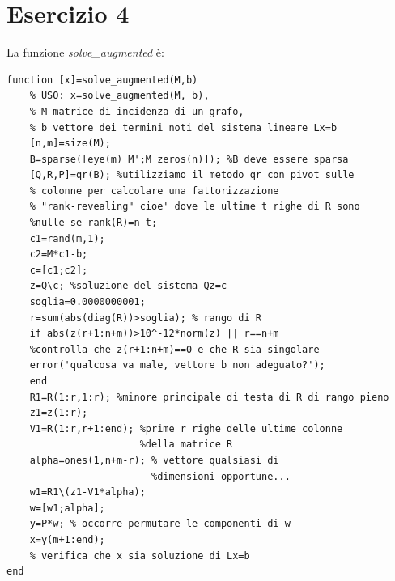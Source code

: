 \documentclass[11pt,a4paper,twoside,openright,titlepage,
                           headinclude,footinclude,BCOR5mm,
                           numbers=noenddot,cleardoublepage=empty,
                           tablecaptionabove]{scrbook}
\begin{document}
\section{Esercizio 4}
La funzione \emph{solve\_augmented} è:
\begin{lstlisting}[frame=trBL]
function [x]=solve_augmented(M,b)
    % USO: x=solve_augmented(M, b),
    % M matrice di incidenza di un grafo,
    % b vettore dei termini noti del sistema lineare Lx=b
    [n,m]=size(M);
    B=sparse([eye(m) M';M zeros(n)]); %B deve essere sparsa
    [Q,R,P]=qr(B); %utilizziamo il metodo qr con pivot sulle
    % colonne per calcolare una fattorizzazione
    % "rank-revealing" cioe' dove le ultime t righe di R sono 
    %nulle se rank(R)=n-t;
    c1=rand(m,1);
    c2=M*c1-b;
    c=[c1;c2];
    z=Q\c; %soluzione del sistema Qz=c
    soglia=0.0000000001;
    r=sum(abs(diag(R))>soglia); % rango di R
    if abs(z(r+1:n+m))>10^-12*norm(z) || r==n+m
    %controlla che z(r+1:n+m)==0 e che R sia singolare
    error('qualcosa va male, vettore b non adeguato?');
    end
    R1=R(1:r,1:r); %minore principale di testa di R di rango pieno
    z1=z(1:r);
    V1=R(1:r,r+1:end); %prime r righe delle ultime colonne 
                       %della matrice R
    alpha=ones(1,n+m-r); % vettore qualsiasi di 
                         %dimensioni opportune...
    w1=R1\(z1-V1*alpha);
    w=[w1;alpha];
    y=P*w; % occorre permutare le componenti di w
    x=y(m+1:end);
    % verifica che x sia soluzione di Lx=b
end
\end{lstlisting}
\newpage
\end{document}
